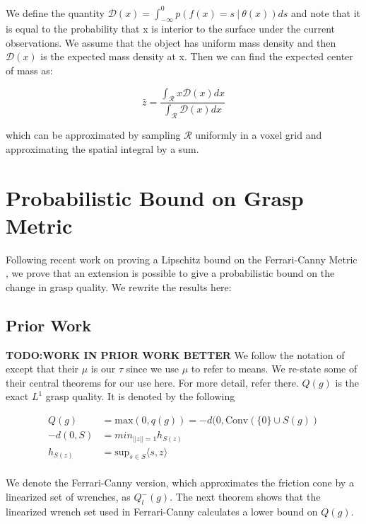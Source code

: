 \documentclass[letterpaper, 10 pt, conference]{ieeeconf}  %
\begin{document}
We define the quantity $\mathcal{D}(x) = \int_{-\infty}^{0} p(f(x) =  s \ | \ \theta(x)) ds$ and note that it is equal to the probability that x is interior to the surface under the current observations.
We assume that the object has uniform mass density and then $\mathcal{D}(x)$ is the expected mass density at x.
Then we can find the expected center of mass as:

\begin{equation}
  \bar{z} 
  =
  \frac
    {\int_{\mathcal{R}}x \mathcal{D}(x) dx}
    {\int_{\mathcal{R}}  \mathcal{D}(x) dx}
\end{equation}

which can be approximated by sampling $\mathcal{R}$ uniformly in a voxel grid and approximating the spatial integral by a sum.


\section{Probabilistic Bound on Grasp Metric}
\label{sec:bound}
Following recent work on proving a Lipschitz bound on the Ferrari-Canny Metric \cite{pokorny2013classical}, we prove that an extension is possible to give a probabilistic bound on the change in grasp quality.
We rewrite the results here:

\subsection{Prior Work}

\textbf{TODO:WORK IN PRIOR WORK BETTER}
We follow the notation of \cite{pokorny2013classical} except that their $\mu$ is our $\tau$ since we use $\mu$ to refer to means.  
We re-state some of their central theorems for our use here.
For more detail, refer there.
$Q(g)$ is the exact $L^1$ grasp quality.
It is denoted by the following 

\begin{align}
  Q(g) &= \mbox{max}(0,q(g)) = -d(0,\mbox{Conv}(\{0\} \cup S(g))\\
-d(0,S) &= min_{||z|| = 1} h_{S(z)}\\
h_{S(z)} &= \mbox{sup}_{s\in S}\langle s,z\rangle\\
\end{align}

We denote the Ferrari-Canny version, which approximates the friction cone by a linearized set of wrenches\cite{ferrari1992}, as $Q^-_l(g)$.
The next theorem shows that the linearized wrench set used in Ferrari-Canny calculates a lower bound on $Q(g)$.\\
\end{document}
